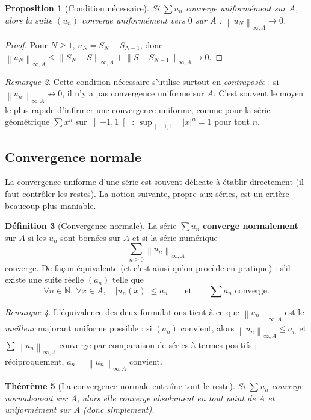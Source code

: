\documentclass[11pt,a4paper]{article}
\theoremstyle{plain}
\newtheorem{theoreme}{Théorème}[section]
\newtheorem{proposition}[theoreme]{Proposition}
\theoremstyle{definition}
\newtheorem{definition}[theoreme]{Définition}
\theoremstyle{remark}
\newtheorem{remarque}[theoreme]{Remarque}
\newcommand{\N}{\mathbb{N}}
\newcommand{\Ninf}[2]{\left\lVert #1 \right\rVert_{\infty,#2}}
\numberwithin{equation}{section}
\begin{document}
\begin{proposition}[Condition nécessaire]\label{prop:cn}
Si $\sum u_n$ converge uniformément sur $A$, alors la suite $(u_n)$
converge uniformément vers $0$ sur $A$ : $\Ninf{u_N}{A}\to 0$.
\end{proposition}

\begin{proof}
Pour $N\geq 1$, $u_N = S_N - S_{N-1}$, donc
$\Ninf{u_N}{A}\leq\Ninf{S_N-S}{A}+\Ninf{S-S_{N-1}}{A}\to 0$.
\end{proof}

\begin{remarque}
Cette condition nécessaire s'utilise surtout en \emph{contraposée} : si
$\Ninf{u_n}{A}\not\to 0$, il n'y a pas convergence uniforme sur $A$. C'est
souvent le moyen le plus rapide d'infirmer une convergence uniforme, comme
pour la série géométrique $\sum x^n$ sur $\left]-1,1\right[$ :
$\sup_{\left]-1,1\right[}\lvert x\rvert^n = 1$ pour tout $n$.
\end{remarque}

\subsection{Convergence normale}

La convergence uniforme d'une série est souvent délicate à établir
directement (il faut contrôler les restes). La notion suivante, propre aux
séries, est un critère beaucoup plus maniable.

\begin{definition}[Convergence normale]
La série $\sum u_n$ \textbf{converge normalement} sur $A$ si les $u_n$
sont bornées sur $A$ et si la série numérique
\[
    \sum_{n\geq 0} \Ninf{u_n}{A}
\]
converge. De façon équivalente (et c'est ainsi qu'on procède en pratique) :
s'il existe une suite réelle $(a_n)$ telle que
\[
    \forall n\in\N,\ \forall x\in A,\quad \lvert u_n(x)\rvert \leq a_n
    \qquad\text{et}\qquad \sum a_n \text{ converge.}
\]
\end{definition}

\begin{remarque}
L'équivalence des deux formulations tient à ce que $\Ninf{u_n}{A}$ est le
\emph{meilleur} majorant uniforme possible : si $(a_n)$ convient, alors
$\Ninf{u_n}{A}\leq a_n$ et $\sum\Ninf{u_n}{A}$ converge par comparaison de
séries à termes positifs ; réciproquement, $a_n = \Ninf{u_n}{A}$ convient.
\end{remarque}

\begin{theoreme}[La convergence normale entraîne tout le reste]\label{thm:cvn}
Si $\sum u_n$ converge normalement sur $A$, alors elle converge
absolument en tout point de $A$ et uniformément sur $A$ (donc simplement).
\end{theoreme}
\end{document}
